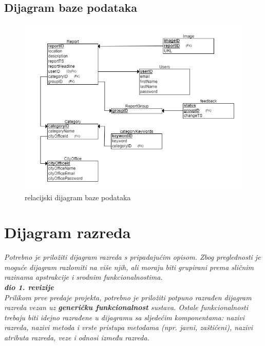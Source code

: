 			\subsection{Dijagram baze podataka}
			
			\begin{figure}[H]
				\includegraphics[width=\textwidth]{slike/relacijski.png} %
				\caption{relacijski dijagram baze podataka}
				\label{fig:DijagramBazePodataka} %
			\end{figure}
			
			\eject
			
			
		\section{Dijagram razreda}
		
			\textit{Potrebno je priložiti dijagram razreda s pripadajućim opisom. Zbog preglednosti je moguće dijagram razlomiti na više njih, ali moraju biti grupirani prema sličnim razinama apstrakcije i srodnim funkcionalnostima.}\\
			
			\textbf{\textit{dio 1. revizije}}\\
			
			\textit{Prilikom prve predaje projekta, potrebno je priložiti potpuno razrađen dijagram razreda vezan uz \textbf{generičku funkcionalnost} sustava. Ostale funkcionalnosti trebaju biti idejno razrađene u dijagramu sa sljedećim komponentama: nazivi razreda, nazivi metoda i vrste pristupa metodama (npr. javni, zaštićeni), nazivi atributa razreda, veze i odnosi između razreda.}\\
			
